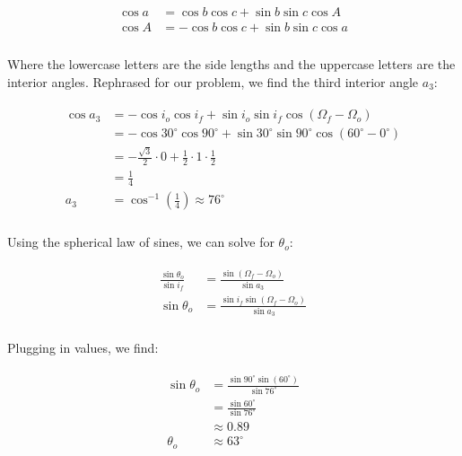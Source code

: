 \documentclass[
]{article}
\begin{document}
\[\begin{aligned}
\begin{aligned}
    \cos a &= \cos b \cos c + \sin b \sin c \cos A \\
    \cos A &= - \cos b \cos c + \sin b \sin c \cos a \\
\end{aligned}
\end{aligned}\]

Where the lowercase letters are the side lengths and the uppercase
letters are the interior angles. Rephrased for our problem, we find the
third interior angle \(a_3\):

\[\begin{aligned}
\begin{aligned}
    \cos a_3 &= - \cos i_o \cos i_f + \sin i_o \sin i_f \cos(\Omega_f - \Omega_o) \\
    &= - \cos 30^\circ \cos 90^\circ + \sin 30^\circ \sin 90^\circ \cos(60^\circ - 0^\circ) \\
    &= - \frac{\sqrt{3}}{2} \cdot 0 + \frac{1}{2} \cdot 1 \cdot \frac{1}{2} \\
    &= \frac{1}{4} \\
    a_3 &= \cos^{-1} \left( \frac{1}{4} \right) \approx 76^\circ \\
\end{aligned}
\end{aligned}\]

Using the spherical law of sines, we can solve for \(\theta_o\):

\[\begin{aligned}
\begin{aligned}
    \frac{\sin\theta_o}{\sin i_f} &= \frac{\sin(\Omega_f - \Omega_o)}{\sin a_3} \\
    \sin\theta_o &= \frac{\sin i_f \sin(\Omega_f - \Omega_o)}{\sin a_3} \\
\end{aligned}
\end{aligned}\]

Plugging in values, we find:

\[\begin{aligned}
\begin{aligned}
    \sin\theta_o &= \frac{\sin 90^\circ \sin(60^\circ)}{\sin 76^\circ} \\
    &= \frac{\sin 60^\circ}{\sin 76^\circ} \\
    &\approx 0.89 \\
    \theta_o &\approx 63^\circ
\end{aligned}
\end{aligned}\]
\end{document}
